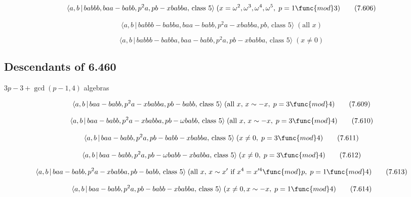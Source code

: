 \documentclass[10pt]{article}
\begin{document}
\begin{equation}
\langle a,b\,|\,babbb,baa-babb,p^{2}a,pb-xbabba,\,\text{class }5\rangle
\;(x=\omega ^{2},\omega ^{3},\omega ^{4},\omega ^{5},\;p=1\func{mod}3) 
\tag{7.606}
\end{equation}

\begin{equation}
\langle a,b\,|\,babbb-babba,baa-babb,p^2a-xbabba,pb,\,\text{class }5\rangle
\;(\text{all }x)  \tag{7.607}
\end{equation}

\begin{equation}
\langle a,b\,|\,babbb-babba,baa-babb,p^2a,pb-xbabba,\,\text{class }5\rangle
\;(x \neq 0)  \tag{7.608}
\end{equation}

\subsection{Descendants of 6.460}

$3p-3+\gcd (p-1,4)$ algebras

\begin{equation}
\langle a,b\,|\,baa-babb,p^{2}a-xbabba,pb-babb,\,\text{class }5\rangle \;(%
\text{all }x,\,x\sim -x,\;p=3\func{mod}4)  \tag{7.609}
\end{equation}

\begin{equation}
\langle a,b\,|\,baa-babb,p^{2}a-xbabba,pb-\omega babb,\,\text{class }%
5\rangle \;(\text{all }x,\,x\sim -x,\;p=3\func{mod}4)  \tag{7.610}
\end{equation}

\begin{equation}
\langle a,b\,|\,baa-babb,p^2a,pb-babb-xbabba,\,\text{class }5\rangle \;(x
\neq 0,\;p=3 \func{mod} 4)  \tag{7.611}
\end{equation}

\begin{equation}
\langle a,b\,|\,baa-babb,p^{2}a,pb-\omega babb-xbabba,\,\text{class }%
5\rangle \;(x\neq 0,\;p=3\func{mod}4)  \tag{7.612}
\end{equation}

\begin{equation}
\langle a,b\,|\,baa-babb,p^{2}a-xbabba,pb-babb,\,\text{class }5\rangle \;(%
\text{all }x,\,x\sim x^{\prime}\text{ if }x^4=x^{\prime 4}\func{mod}p,\;p=1%
\func{mod}4)  \tag{7.613}
\end{equation}

\begin{equation}
\langle a,b\,|\,baa-babb,p^2a,pb-babb-xbabba,\,\text{class }5\rangle \;(x
\neq 0, x \sim -x,\;p=1 \func{mod} 4)  \tag{7.614}
\end{equation}
\end{document}
